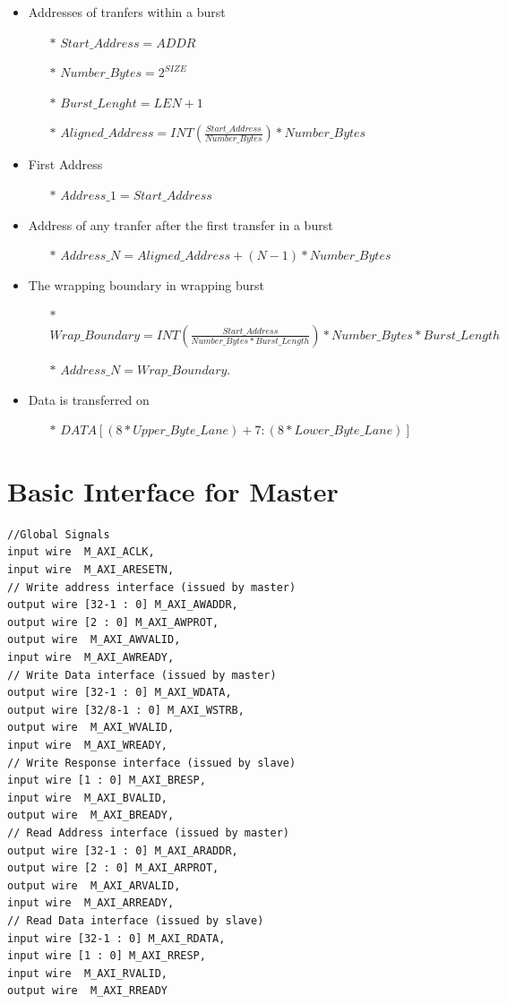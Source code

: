 \documentclass{article}
\begin{document}
\begin{itemize}
    \item Addresses of tranfers within a burst
    \begin{itemize}
        \item[$*$] $Start\_Address = ADDR$
        \item[$*$] $Number\_Bytes = 2^{SIZE}$
        \item[$*$] $Burst\_Lenght = LEN + 1 $
        \item[$*$] $Aligned\_Address = INT(\frac{Start\_Address}{Number\_Bytes}) * Number\_Bytes$
    \end{itemize}
    \item First Address
    \begin{itemize}
        \item[$*$] $Address\_1 = Start\_Address$
    \end{itemize}
    \item Address of any tranfer after the first transfer in a burst
    \begin{itemize}
        \item[$*$] $Address\_N = Aligned\_Address + (N-1)*Number\_Bytes$
    \end{itemize}
    \item The wrapping boundary in wrapping burst
    \begin{itemize}
        \item[$*$] $Wrap\_Boundary = INT(\frac{Start\_Address}{Number\_Bytes * Burst\_Length}) * Number\_Bytes * Burst\_Length$ 
        \item[$*$] $Address\_N = Wrap\_Boundary$. 
    \end{itemize}
    \item Data is transferred on
    \begin{itemize}
        \item[$*$] $DATA[(8*Upper\_Byte\_Lane) + 7 : (8*Lower\_Byte\_Lane)]$
    \end{itemize}
\end{itemize}

\section{Basic Interface for Master}
\begin{verbatim}
//Global Signals
input wire  M_AXI_ACLK,
input wire  M_AXI_ARESETN,
// Write address interface (issued by master)
output wire [32-1 : 0] M_AXI_AWADDR,
output wire [2 : 0] M_AXI_AWPROT,
output wire  M_AXI_AWVALID,
input wire  M_AXI_AWREADY,
// Write Data interface (issued by master)
output wire [32-1 : 0] M_AXI_WDATA,
output wire [32/8-1 : 0] M_AXI_WSTRB,
output wire  M_AXI_WVALID,
input wire  M_AXI_WREADY,
// Write Response interface (issued by slave)
input wire [1 : 0] M_AXI_BRESP,
input wire  M_AXI_BVALID,
output wire  M_AXI_BREADY,
// Read Address interface (issued by master)
output wire [32-1 : 0] M_AXI_ARADDR,
output wire [2 : 0] M_AXI_ARPROT,
output wire  M_AXI_ARVALID,
input wire  M_AXI_ARREADY,
// Read Data interface (issued by slave)
input wire [32-1 : 0] M_AXI_RDATA,
input wire [1 : 0] M_AXI_RRESP,
input wire  M_AXI_RVALID,
output wire  M_AXI_RREADY
\end{verbatim}
\end{document}
